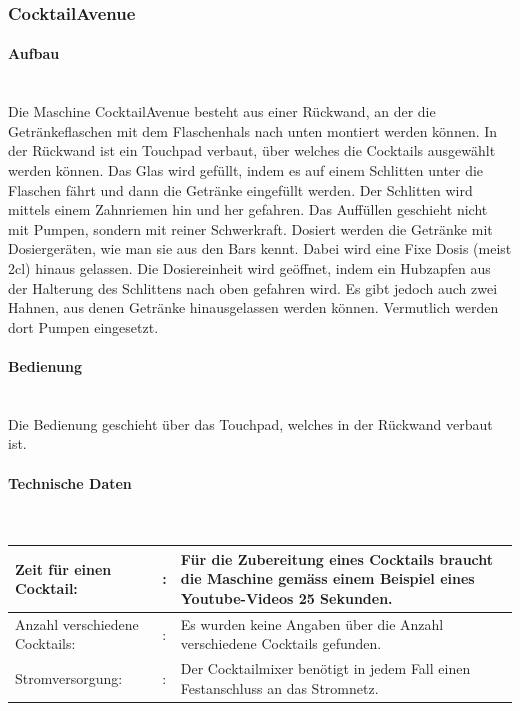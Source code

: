 \subsubsection{CocktailAvenue}\label{subsubsec:CocktailAvenue}
\paragraph{Aufbau}\label{subsubsec:Aufbau_CocktailAvenue}\mbox{}\\

Die Maschine CocktailAvenue besteht aus einer Rückwand, an der die Getränkeflaschen mit dem Flaschenhals nach unten montiert werden können. In der Rückwand ist ein Touchpad verbaut, über welches die Cocktails ausgewählt werden können. Das Glas wird gefüllt, indem es auf einem Schlitten unter die Flaschen fährt und dann die Getränke eingefüllt werden. Der Schlitten wird mittels einem Zahnriemen hin und her gefahren. Das Auffüllen geschieht nicht mit Pumpen, sondern mit reiner Schwerkraft. Dosiert werden die Getränke mit Dosiergeräten, wie man sie aus den Bars kennt. Dabei wird eine Fixe Dosis (meist 2cl) hinaus gelassen. Die Dosiereinheit wird geöffnet, indem ein Hubzapfen aus der Halterung des Schlittens nach oben gefahren wird. Es gibt jedoch auch zwei Hahnen, aus denen Getränke hinausgelassen werden können. Vermutlich werden dort Pumpen eingesetzt.\cite{igus_automatisiertes_nodate}

\paragraph{Bedienung}\label{subsubsec:Bedienung_CocktailAvenue}\mbox{}\\

Die Bedienung geschieht über das Touchpad, welches in der Rückwand verbaut ist.\cite{igus_automatisiertes_nodate}

\paragraph{Technische Daten}\label{subsubsec:Technische_Daten_CocktailAvenue}\mbox{}\\

\begin{tabular}{@{}llp{}}
    Zeit für einen Cocktail: & : & Für die Zubereitung eines Cocktails braucht die Maschine gemäss einem Beispiel eines Youtube-Videos 25 Sekunden. \cite{cocktail_1_2017}\\
    \hline
    Anzahl verschiedene Cocktails: & : & Es wurden keine Angaben über die Anzahl verschiedene Cocktails gefunden. \\ 
    \hline
    Stromversorgung: & : & Der Cocktailmixer benötigt in jedem Fall einen Festanschluss an das Stromnetz.\cite{igus_automatisiertes_nodate} \\
\end{tabular}

